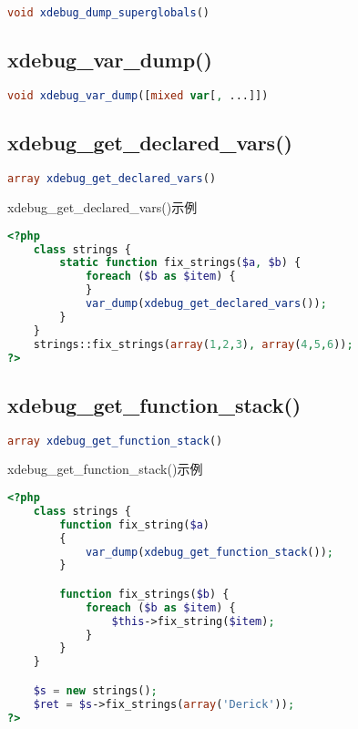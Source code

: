 \begin{lstlisting}[language=PHP]
void xdebug_dump_superglobals()
\end{lstlisting}

\subsection{xdebug\_var\_dump()}



\begin{lstlisting}[language=PHP]
void xdebug_var_dump([mixed var[, ...]])
\end{lstlisting}


\subsection{xdebug\_get\_declared\_vars()}



\begin{lstlisting}[language=PHP]
array xdebug_get_declared_vars()
\end{lstlisting}



\begin{example}
xdebug\_get\_declared\_vars()示例
\begin{lstlisting}[language=PHP]
<?php
    class strings {
        static function fix_strings($a, $b) {
            foreach ($b as $item) {
            }
            var_dump(xdebug_get_declared_vars());
        }
    }
    strings::fix_strings(array(1,2,3), array(4,5,6));
?>
\end{lstlisting}
\end{example}

\subsection{xdebug\_get\_function\_stack()}


\begin{lstlisting}[language=PHP]
array xdebug_get_function_stack()
\end{lstlisting}

\begin{example}
xdebug\_get\_function\_stack()示例
\begin{lstlisting}[language=PHP]
<?php
    class strings {
        function fix_string($a)
        {
            var_dump(xdebug_get_function_stack());
        }

        function fix_strings($b) {
            foreach ($b as $item) {
                $this->fix_string($item);
            }
        }
    }

    $s = new strings();
    $ret = $s->fix_strings(array('Derick'));
?>
\end{lstlisting}
\end{example}

